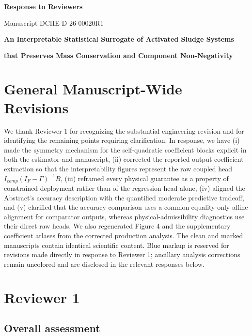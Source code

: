 \documentclass[11pt,a4paper]{article}
\begin{document}
\begin{center}
{\Large\bfseries Response to Reviewers}\par
\vspace{0.5em}
{\large Manuscript DCHE-D-26-00020R1}\par
\vspace{0.5em}
{\large\bfseries An Interpretable Statistical Surrogate of Activated Sludge Systems}\par
{\large\bfseries that Preserves Mass Conservation and Component Non-Negativity}
\end{center}

\section*{General Manuscript-Wide Revisions}

We thank Reviewer 1 for recognizing the substantial engineering revision and for identifying the remaining points requiring clarification. In response, we have (i) made the symmetry mechanism for the self-quadratic coefficient blocks explicit in both the estimator and manuscript, (ii) corrected the reported-output coefficient extraction so that the interpretability figures represent the raw coupled head $I_{comp}(I_F-\Gamma)^{-1}B$, (iii) reframed every physical guarantee as a property of constrained deployment rather than of the regression head alone, (iv) aligned the Abstract's accuracy description with the quantified moderate predictive tradeoff, and (v) clarified that the accuracy comparison uses a common equality-only affine alignment for comparator outputs, whereas physical-admissibility diagnostics use their direct raw heads. We also regenerated Figure 4 and the supplementary coefficient atlases from the corrected production analysis. The clean and marked manuscripts contain identical scientific content. Blue markup is reserved for revisions made directly in response to Reviewer 1; ancillary analysis corrections remain uncolored and are disclosed in the relevant responses below.

\section*{Reviewer 1}

\subsection*{Overall assessment}
\end{document}
